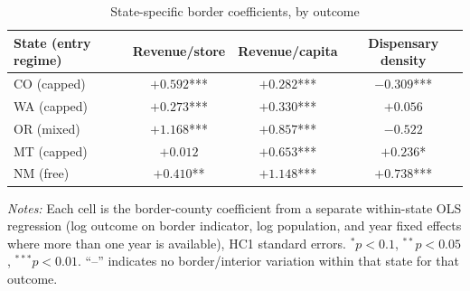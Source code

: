 \begin{table}[htbp]
\centering
\caption{State-specific border coefficients, by outcome}
\label{tab:state_specific}
\begin{tabular}{lccc}
\toprule
State (entry regime) & Revenue/store & Revenue/capita & Dispensary density \\
\midrule
CO (capped) & $+0.592$*** & $+0.282$*** & $-0.309$*** \\
WA (capped) & $+0.273$*** & $+0.330$*** & $+0.056$ \\
OR (mixed) & $+1.168$*** & $+0.857$*** & $-0.522$ \\
MT (capped) & $+0.012$ & $+0.653$*** & $+0.236$* \\
NM (free) & $+0.410$** & $+1.148$*** & $+0.738$*** \\
\bottomrule
\end{tabular}
\begin{minipage}{0.85\textwidth}
\vspace{0.3em}
\footnotesize
\textit{Notes:} Each cell is the border-county coefficient from a separate within-state OLS regression
(log outcome on border indicator, log population, and year fixed effects where more than one year is
available), HC1 standard errors. $^{*}p<0.1$, $^{**}p<0.05$, $^{***}p<0.01$. ``--'' indicates no
border/interior variation within that state for that outcome.
\end{minipage}
\end{table}
